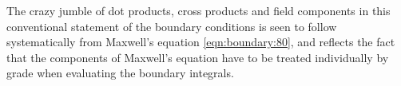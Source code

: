 The crazy jumble of dot products, cross products and field components in this conventional statement of the boundary conditions is seen to follow systematically from Maxwell's equation \cref{eqn:boundary:80}, and reflects the fact that the components of Maxwell's equation have to be treated individually by grade when evaluating the boundary integrals.
